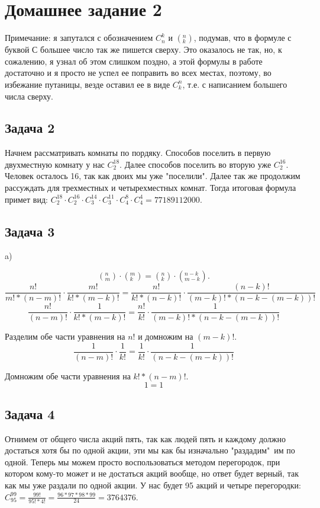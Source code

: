 

	\section{Домашнее задание 2} 
	Примечание: я запутался с обозначением $C_{n}^{k}$ и $\left(_{k}^{n}\right)$, подумав, что в формуле с буквой С большее число так же пишется сверху. Это оказалось не так, но, к сожалению, я узнал об этом слишком поздно, а этой формулы в работе достаточно и я просто не успел ее поправить во всех местах, поэтому, во избежание путаницы, везде оставил ее в виде $C_{k}^{n}$,  т.е. с написанием большего числа сверху.
	
	\subsection{Задача 2}
	Начнем рассматривать комнаты по пордяку. Способов поселить в первую двухместную комнату у нас $C_{2}^{18}$. Далее способов поселить во вторую уже $C_{2}^{16}$. Человек осталось 16, так как двоих мы уже "поселили".
	Далее так же продолжим рассуждать для трехместных и четырехместных комнат. Тогда итоговая формула примет вид:
	$C_{2}^{18} \cdot C_{2}^{16} \cdot C_{3}^{14} \cdot C_{3}^{11} \cdot C_{4}^{8} \cdot C_{4}^{4} = 77189112000$.
	
	\subsection{Задача 3}
	a)
	
	\[
		\left(_{m}^{n}\right) \cdot \left(_{k}^{m}\right) = \left(_{k}^{n}\right) \cdot \left(_{m - k}^{n - k}\right).
	 \]
	 \[
		 \frac{n!}{m!*(n-m)!} \cdot  \frac{m!}{k!*(m-k)!} = \frac{n!}{k!*(n-k)!} \cdot  \frac{(n-k)!}{(m-k)!*(n-k-(m-k))!}
	 \]
	 \[
		 \frac{n!}{(n-m)!} \cdot  \frac{1}{k!*(m-k)!} = \frac{n!}{k!} \cdot  \frac{1}{(m-k)!*(n-k-(m-k))!}
	 \]
	 
	 Разделим обе части уравнения на $n!$ и домножим на $(m-k)!$.
	 \[
		 \frac{1}{(n-m)!} \cdot  \frac{1}{k!} = \frac{1}{k!} \cdot  \frac{1}{(n-k-(m-k))!}
	 \]
	 
	 Домножим обе части уравнения на $k!*(n-m)!$.
	 \[
		 1 = 1
	 \]
	 
	
	\subsection{Задача 4}
	Отнимем от общего числа акций пять, так как людей пять и каждому должно достаться хотя бы по одной акции, эти мы как бы изначально "раздадим"\  им по одной. 
	Теперь мы можем просто воспользоваться методом перегородок, при котором кому-то может и не достаться акций вообще, но ответ будет верный, так как мы уже раздали по одной акции.
	У нас будет 95 акций и четыре перегородки: 
	$C_{95}^{99} = \frac{99!}{95! * 4!} = \frac{96*97*98*99}{24} = 3764376$.
	
